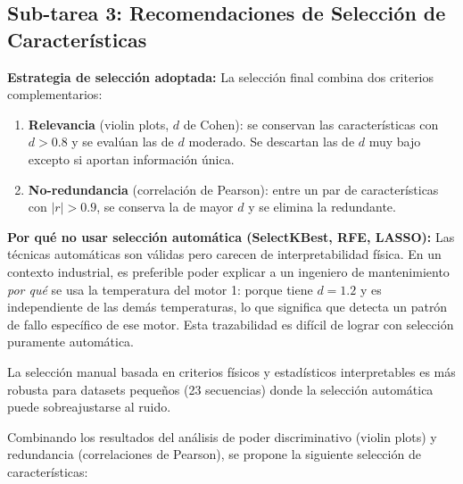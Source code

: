 \documentclass[12pt,a4paper]{article}
\begin{document}
\subsection{Sub-tarea 3: Recomendaciones de Selección de Características}

\begin{whybox}
\textbf{Estrategia de selección adoptada:}
La selección final combina dos criterios complementarios:

\begin{enumerate}[leftmargin=1.5em]
  \item \textbf{Relevancia} (violin plots, $d$ de Cohen): se conservan las
    características con $d > 0.8$ y se evalúan las de $d$ moderado. Se descartan
    las de $d$ muy bajo excepto si aportan información única.

  \item \textbf{No-redundancia} (correlación de Pearson): entre un par de
    características con $|r| > 0.9$, se conserva la de mayor $d$ y se elimina
    la redundante.
\end{enumerate}

\textbf{Por qué no usar selección automática (SelectKBest, RFE, LASSO):}
Las técnicas automáticas son válidas pero carecen de interpretabilidad física.
En un contexto industrial, es preferible poder explicar a un ingeniero de mantenimiento
\emph{por qué} se usa la temperatura del motor 1: porque tiene $d = 1.2$ y es
independiente de las demás temperaturas, lo que significa que detecta un patrón
de fallo específico de ese motor. Esta trazabilidad es difícil de lograr con
selección puramente automática.

La selección manual basada en criterios físicos y estadísticos interpretables es
más robusta para datasets pequeños (23 secuencias) donde la selección automática
puede sobreajustarse al ruido.
\end{whybox}

Combinando los resultados del análisis de poder discriminativo (violin plots) y
redundancia (correlaciones de Pearson), se propone la siguiente selección de
características:
\end{document}
